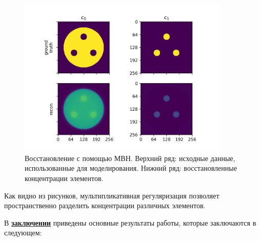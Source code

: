 \begin{figure}
\label{fig:whiteres}
\centering
  \includegraphics[width=0.9\textwidth]{Dissertation/images/part3_img/recon} 
\caption{Восстановление с помощью МВН. Верхний ряд: исходные данные, использованные для моделирования. Нижний ряд: восстановленные концентрации элементов.}
\vspace{5mm}
\end{figure}

Как видно из рисунков, мультипликативная регуляризация позволяет пространственно разделить концентрации различных элементов.

В \underline{\textbf{заключении}} приведены основные результаты работы, которые заключаются в следующем:

\newpage
{} %

